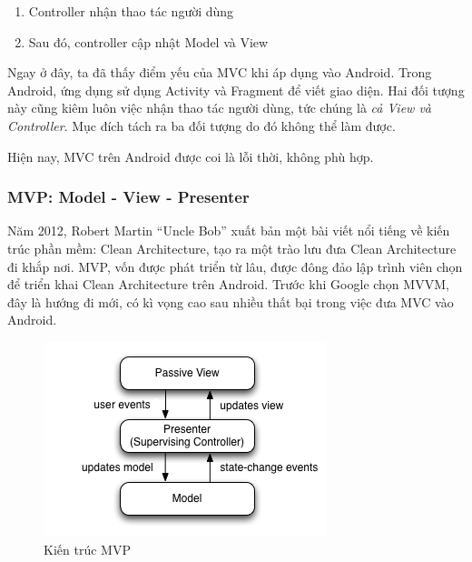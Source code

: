 \documentclass[../../thesis]{subfiles}
\begin{document}
\begin{enumerate}
    \item
        Controller nhận thao tác người dùng
    \item
        Sau đó, controller cập nhật Model và View
\end{enumerate}

Ngay ở đây, ta đã thấy điểm yếu của MVC khi áp dụng vào Android. Trong Android,
ứng dụng sử dụng Activity và Fragment để viết giao diện. Hai đối tượng này cũng
kiêm luôn việc nhận thao tác người dùng, tức chúng là \emph{cả View và
Controller}. Mục đích tách ra ba đối tượng do đó không thể làm được.

Hiện nay, MVC trên Android được coi là lỗi thời, không phù hợp.

\subsubsection{MVP: Model - View - Presenter}

Năm 2012, Robert Martin ``Uncle Bob'' xuất bản một bài viết nổi tiếng về
kiến trúc phần mềm: Clean Architecture, tạo ra một trào lưu đưa Clean
Architecture đi khắp nơi. MVP, vốn được phát triển từ lâu, được đông đảo
lập trình viên chọn để triển khai Clean Architecture trên Android. Trước
khi Google chọn MVVM, đây là hướng đi mới, có kì vọng cao sau nhiều thất
bại trong việc đưa MVC vào Android.

\begin{figure}
    \centering
    \vspace*{-5mm}
    \includegraphics[width=\linewidth]{../images/Model_View_Presenter_GUI_Design_Pattern.png}
    \vspace*{-10mm}
    \caption{Kiến trúc MVP \cite{WIKI_MVP}}
    \label{fig:mvp}
\end{figure}
\end{document}
